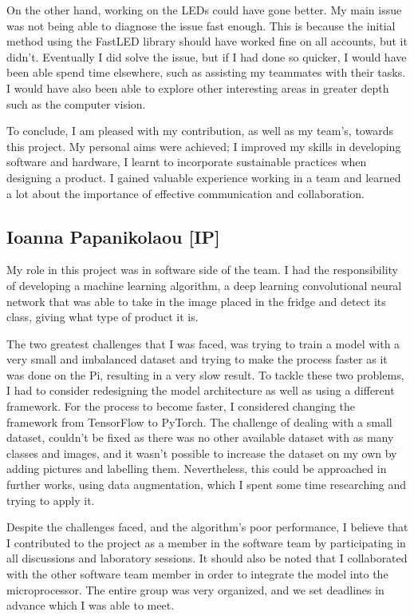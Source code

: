 On the other hand, working on the LEDs could have gone better.
My main issue was not being able to diagnose the issue fast enough.
This is because the initial method using the FastLED library should have worked fine on all accounts, but it didn't.
Eventually I did solve the issue, but if I had done so quicker, I would have been able spend time elsewhere, such as assisting my teammates with their tasks.
I would have also been able to explore other interesting areas in greater depth such as the computer vision.

To conclude, I am pleased with my contribution, as well as my team's, towards this project.
My personal aims were achieved; I improved my skills in developing software and hardware, I learnt to incorporate sustainable practices when designing a product.
I gained valuable experience working in a team and learned a lot about the importance of effective communication and collaboration.


\subsection{Ioanna Papanikolaou [IP]}
My role in this project was in software side of the team.
I had the responsibility of developing a machine learning algorithm, a deep learning convolutional neural network that was able to take in the image placed in the fridge and detect its class, giving what type of product it is.

The two greatest challenges that I was faced, was trying to train a model with a very small and imbalanced dataset and trying to make the process faster as it was done on the Pi, resulting in a very slow result.
To tackle these two problems, I had to consider redesigning the model architecture as well as using a different framework.
For the process to become faster, I considered changing the framework from TensorFlow to PyTorch.
The challenge of dealing with a small dataset, couldn't be fixed as there was no other available dataset with as many classes and images, and it wasn't possible to increase the dataset on my own by adding pictures and labelling them.
Nevertheless, this could be approached in further works, using data augmentation, which I spent some time researching and trying to apply it.

Despite the challenges faced, and the algorithm's poor performance, I believe that I contributed to the project as a member in the software team by participating in all discussions and laboratory sessions.
It should also be noted that I collaborated with the other software team member in order to integrate the model into the microprocessor.
The entire group was very organized, and we set deadlines in advance which I was able to meet.


